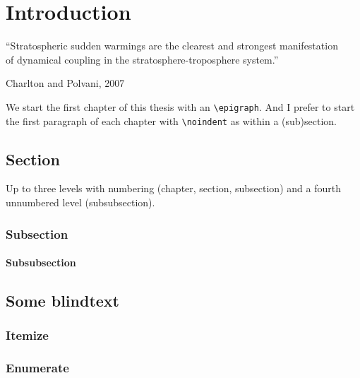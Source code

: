 \chapter{Introduction}\label{ch:introduction}

\epigraph{
   ``Stratospheric sudden warmings are the clearest and strongest manifestation\\
   of dynamical coupling in the stratosphere-troposphere system.''
}{Charlton and Polvani, 2007}


\noindent
We start the first chapter of this thesis with an \verb|\epigraph|. And I prefer to start the first paragraph of each chapter with \verb|\noindent| as within a (sub)section.

%
% 
\section{Section}
\label{introduction:sec}
%

Up to three levels with numbering (chapter, section, subsection) and a fourth unnumbered level (subsubsection).

%
% 
\subsection{Subsection}
\label{introduction:sec:subsec}
%

%
% 
\subsubsection{Subsubsection}
\label{introduction:sec:subsec:subsubsec}
%

%
% 
\section{Some blindtext}

\blindtext[1]

\bigskip

\blindtext[2]

%
% 
\subsection{Itemize}

\blinditemize[3]

%
% 
\subsection{Enumerate}

